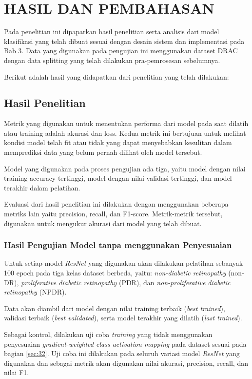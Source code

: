 \chapter{HASIL DAN PEMBAHASAN}
\label{chap:4}

Pada penelitian ini dipaparkan hasil penelitian serta analisis dari model klasifikasi yang telah dibuat sesuai dengan desain sistem dan implementasi pada Bab 3. Data yang digunakan pada pengujian ini menggunakan dataset DRAC dengan data splitting yang telah dilakukan pra-pemrosesan sebelumnya.

Berikut adalah hasil yang didapatkan dari penelitian yang telah dilakukan:

\section{Hasil Penelitian}
\label{sec:41}

Metrik yang digunakan untuk menentukan performa dari model pada saat dilatih atau training adalah akurasi dan loss. Kedua metrik ini bertujuan untuk melihat kondisi model telah fit atau tidak yang dapat menyebabkan kesulitan dalam memprediksi data yang belum pernah dilihat oleh model tersebut.

Model yang digunakan pada proses pengujian ada tiga, yaitu model dengan nilai training accuracy tertinggi, model dengan nilai validasi tertinggi, dan model terakhir dalam pelatihan.

Evaluasi dari hasil penelitian ini dilakukan dengan menggunakan beberapa metriks lain yaitu precision, recall, dan F1-score. Metrik-metrik tersebut, digunakan untuk mengukur akurasi dari model yang telah dibuat.

\subsection{Hasil Pengujian Model tanpa menggunakan Penyesuaian}
\label{sec:411}

Untuk setiap model \emph{ResNet} yang digunakan akan dilakukan pelatihan sebanyak 100 epoch pada tiga kelas dataset berbeda, yaitu: \emph{non-diabetic retinopathy} (non-DR), \emph{proliferative diabetic retinopathy} (PDR), dan \emph{non-proliferative diabetic retinopathy} (NPDR).

Data akan diambil dari model dengan nilai training terbaik (\emph{best trained}), validasi terbaik (\emph{best validated}), serta model terakhir yang dilatih (\emph{last trained}).

Sebagai kontrol, dilakukan uji coba \emph{training} yang tidak menggunakan penyesuaian \emph{gradient-weighted class activation mapping} pada dataset sesuai pada bagian \ref{sec:32}. Uji coba ini dilakukan pada seluruh variasi model \emph{ResNet} yang digunakan dan sebagai metrik akan digunakan nilai akurasi, precision, recall, dan nilai F1.

